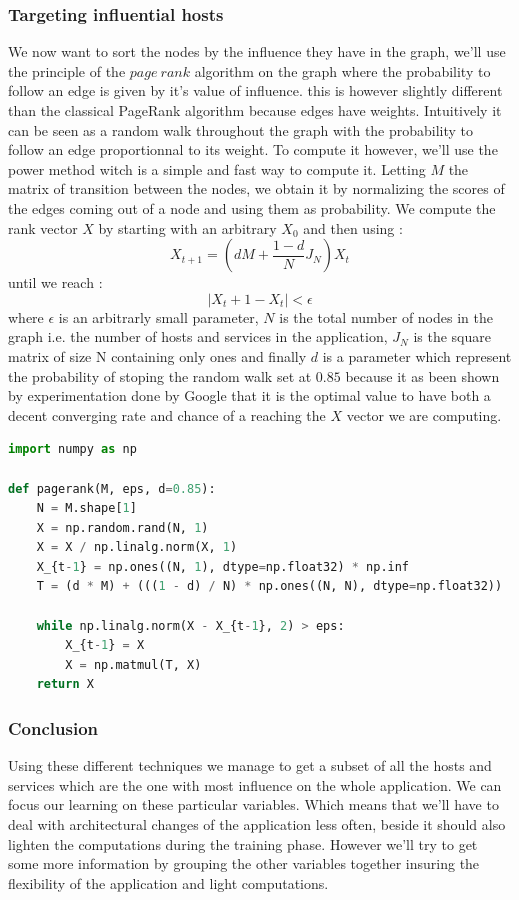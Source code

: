 \documentclass[10pt,a4paper,oneside]{article}
\begin{document}
\begin{multicols}{2}
\subsubsection{Targeting influential hosts}
We now want to sort the nodes by the influence they have in the graph, we'll use the principle of the $page~rank$ algorithm on the graph where the probability to follow an edge is given by it's value of influence. this is however slightly different than the classical PageRank algorithm because edges have weights. Intuitively it can be seen as a random walk throughout the graph with the probability to follow an edge proportionnal to its weight. To compute it however, we'll  use the power method witch is a simple and fast way to compute it. Letting $M$ the matrix of transition between the nodes, we obtain it by normalizing the scores of the edges coming out of a node and using them as probability. We compute the rank vector $X$ by starting with an arbitrary $X_0$ and then using :
	\[X_{t+1} = (dM + \frac{1-d}{N}J_N)X_t\]
until we reach :
	\[ \mid{X_t+1 - X_t}\mid < \epsilon\]
where $\epsilon$ is an arbitrarly small parameter, $N$ is the total number of nodes in the graph i.e. the number of hosts and services in the application, $J_N$ is the square matrix of size N containing only ones and finally $d$ is a parameter which represent the probability of stoping the random walk set at $0.85$ because it as been shown by experimentation done by Google that it is the optimal value to have both a decent converging rate and chance of a reaching the $X$ vector we are computing.
\end{multicols}

\begin{lstlisting}[language=Python, caption=Python Power Method]
import numpy as np

def pagerank(M, eps, d=0.85):
    N = M.shape[1]
    X = np.random.rand(N, 1)
    X = X / np.linalg.norm(X, 1)
    X_{t-1} = np.ones((N, 1), dtype=np.float32) * np.inf
    T = (d * M) + (((1 - d) / N) * np.ones((N, N), dtype=np.float32))
    
    while np.linalg.norm(X - X_{t-1}, 2) > eps: 
        X_{t-1} = X
        X = np.matmul(T, X)
    return X

\end{lstlisting}

\subsubsection{Conclusion}
Using these different techniques we manage to get a subset of all the hosts and services which are the one with most influence on the whole application. We can focus our learning on these particular variables. Which means that we'll have to deal with architectural changes of the application less often, beside it should also lighten the computations during the training phase. However we'll try to get some more information by grouping the other variables together insuring the flexibility of the application and light computations.\\
\end{document}
